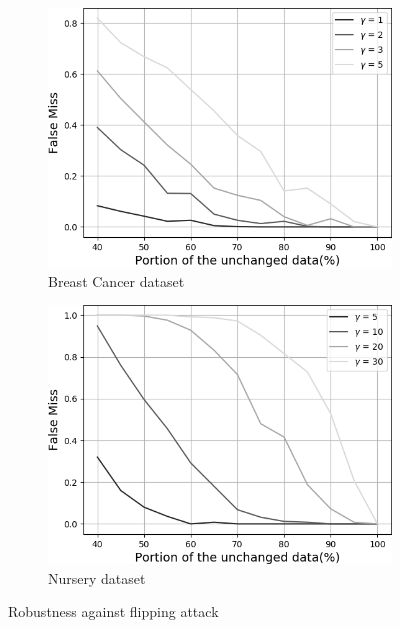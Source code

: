 \documentclass[runningheads]{llncs}
\begin{document}
\begin{figure}[th]
    \centering
    \begin{subfigure}{.42\textwidth}
        \includegraphics[width=1\linewidth]{figures/bit_flipping_bc_grey.png}
        \caption{Breast Cancer dataset}
        \label{fig:bit-flipping-bc}
    \end{subfigure}
    \hspace{0.02\textwidth}
    \begin{subfigure}{.42\textwidth}
        \includegraphics[width=1\linewidth]{figures/bit-flipping_n_grey.png}
        \caption{Nursery dataset}
        \label{fig:bit-flipping-n}
    \end{subfigure}
    \caption{Robustness against flipping attack}
    \label{fig:bit-flipping}
\end{figure}
\end{document}
